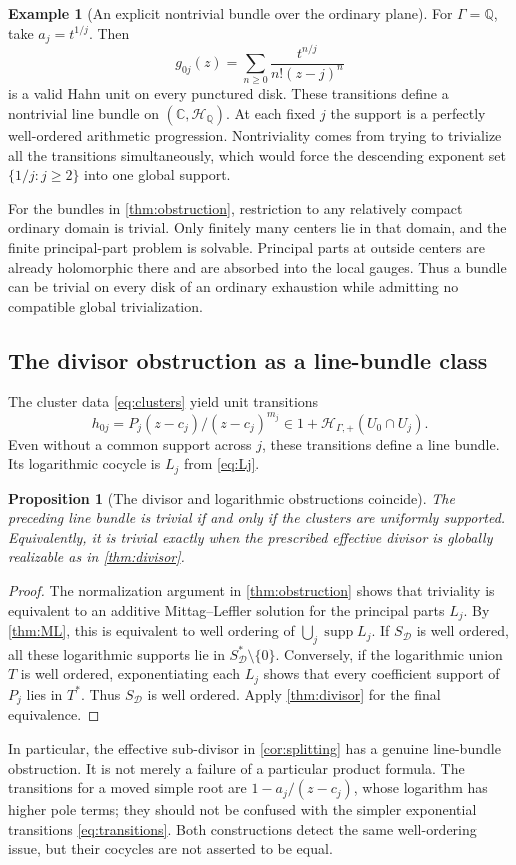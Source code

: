 \documentclass[11pt,letterpaper]{article}
\newtheorem{proposition}[proposition]{Proposition}
\theoremstyle{definition}
\newtheorem{example}[example]{Example}
\theoremstyle{remark}
\newcommand{\C}{\mathbb C}
\newcommand{\Q}{\mathbb Q}
\newcommand{\HP}{\mathscr H_{\Gamma,+}}
\newcommand{\supp}{\operatorname{supp}}
\numberwithin{equation}{section}
\begin{document}
\begin{example}[An explicit nontrivial bundle over the ordinary plane]\label{ex:bundle}
For $\Gamma=\Q$, take $a_j=t^{1/j}$. Then
\[
 g_{0j}(z)=\sum_{n\ge0}\frac{t^{n/j}}{n!(z-j)^n}
\]
is a valid Hahn unit on every punctured disk. These transitions define a nontrivial line bundle on $(\C,\mathscr H_\Q)$. At each fixed $j$ the support is a perfectly well-ordered arithmetic progression. Nontriviality comes from trying to trivialize all the transitions simultaneously, which would force the descending exponent set $\{1/j:j\ge2\}$ into one global support.
\end{example}
For the bundles in \cref{thm:obstruction}, restriction to any relatively compact ordinary domain is trivial. Only finitely many centers lie in that domain, and the finite principal-part problem is solvable. Principal parts at outside centers are already holomorphic there and are absorbed into the local gauges. Thus a bundle can be trivial on every disk of an ordinary exhaustion while admitting no compatible global trivialization.

\subsection{The divisor obstruction as a line-bundle class}
The cluster data \eqref{eq:clusters} yield unit transitions
\[
 h_{0j}=P_j(z-c_j)/(z-c_j)^{m_j}\in1+\HP(U_0\cap U_j).
\]
Even without a common support across $j$, these transitions define a line bundle. Its logarithmic cocycle is $L_j$ from \eqref{eq:Lj}.

\begin{proposition}[The divisor and logarithmic obstructions coincide]\label{prop:divPic}
The preceding line bundle is trivial if and only if the clusters are uniformly supported. Equivalently, it is trivial exactly when the prescribed effective divisor is globally realizable as in \cref{thm:divisor}.
\end{proposition}
\begin{proof}
The normalization argument in \cref{thm:obstruction} shows that triviality is equivalent to an additive Mittag--Leffler solution for the principal parts $L_j$. By \cref{thm:ML}, this is equivalent to well ordering of $\bigcup_j\supp L_j$. If $S_{\mathcal D}$ is well ordered, all these logarithmic supports lie in $S_{\mathcal D}^*\setminus\{0\}$. Conversely, if the logarithmic union $T$ is well ordered, exponentiating each $L_j$ shows that every coefficient support of $P_j$ lies in $T^*$. Thus $S_{\mathcal D}$ is well ordered. Apply \cref{thm:divisor} for the final equivalence.
\end{proof}
In particular, the effective sub-divisor in \cref{cor:splitting} has a genuine line-bundle obstruction. It is not merely a failure of a particular product formula. The transitions for a moved simple root are $1-a_j/(z-c_j)$, whose logarithm has higher pole terms; they should not be confused with the simpler exponential transitions \eqref{eq:transitions}. Both constructions detect the same well-ordering issue, but their cocycles are not asserted to be equal.
\end{document}
